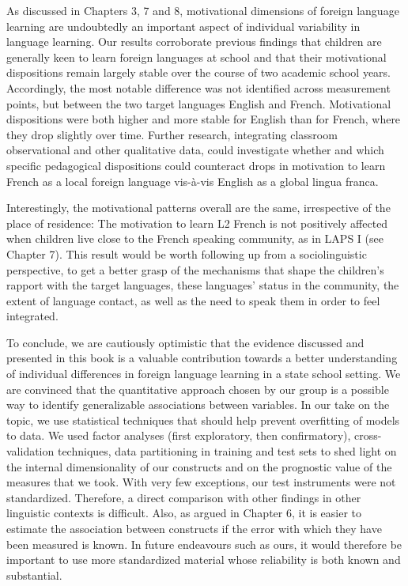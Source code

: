 \documentclass[output=paper]{langsci/langscibook}
\begin{document}
As discussed in Chapters 3, 7 and 8, motivational dimensions of foreign language learning are undoubtedly an important aspect of individual variability in language learning. Our results corroborate previous findings that children are generally keen to learn foreign languages at school and that their motivational dispositions remain largely stable over the course of two academic school years. Accordingly, the most notable difference was not identified across measurement points, but between the two target languages English and French. Motivational dispositions were both higher and more stable for English than for French, where they drop slightly over time. Further research, integrating classroom observational and other qualitative data, could investigate whether and which specific pedagogical dispositions could counteract drops in motivation to learn French as a local foreign language vis-à-vis English as a global lingua franca.

Interestingly, the motivational patterns overall are the same, irrespective of the place of residence: The motivation to learn L2 French is not positively affected when children live close to the French speaking community, as in LAPS I (see Chapter 7). This result would be worth following up from a sociolinguistic perspective, to get a better grasp of the mechanisms that shape the children’s rapport with the target languages, these languages’ status in the community, the extent of language contact, as well as the need to speak them in order to feel integrated.

To conclude, we are cautiously optimistic that the evidence discussed and presented in this book is a valuable contribution towards a better understanding of individual differences in foreign language learning in a state school setting. We are convinced that the quantitative approach chosen by our group is a possible way to identify generalizable associations between variables. In our take on the topic, we use statistical techniques that should help prevent overfitting of models to data. We used factor analyses (first exploratory, then confirmatory), cross-validation techniques, data partitioning in training and test sets to shed light on the internal dimensionality of our constructs and on the prognostic value of the measures that we took. With very few exceptions, our test instruments were not standardized. Therefore, a direct comparison with other findings in other linguistic contexts is difficult. Also, as argued in Chapter 6, it is easier to estimate the association between constructs if the error with which they have been measured is known. In future endeavours such as ours, it would therefore be important to use more standardized material whose reliability is both known and substantial. 
\end{document}
